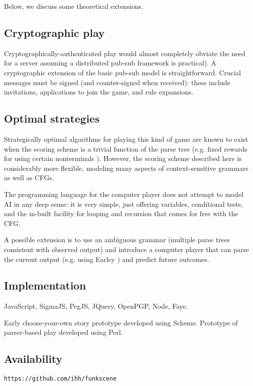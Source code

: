 \documentclass{acm_proc_article-sp}
\begin{document}
Below, we discuss some theoretical extensions.

\subsection{Cryptographic play}

Cryptographically-authenticated play would almost completely obviate the need for a server
assuming a distributed pub-sub framework is practical).
A cryptographic extension of the basic pub-sub model is straightforward.
Crucial messages must be signed (and counter-signed when received):
these include invitations, applications to join the game, and rule expansions.

\subsection{Optimal strategies}

Strategically optimal algorithms for playing this kind of game are known to exist when the scoring scheme is a trivial function of the parse tree (e.g. fixed rewards for using certain nonterminals \cite{DBLP:conf/icalp/EtessamiWY08}).
However, the scoring scheme described here is considerably more flexible, modeling many aspects of context-sensitive grammars as well as CFGs.

The programming language for the computer player does not attempt to model AI in any deep sense:
it is very simple, just offering variables, conditional tests, and the in-built facility for looping and recursion that comes for free with the CFG.

A possible extension is to use an ambiguous grammar (multiple parse trees consistent with observed output)
and introduce a computer player that can parse the current output (e.g. using Earley \cite{Stolcke}) and predict future outcomes.

\subsection{Implementation}

JavaScript, SigmaJS, PegJS, JQuery, OpenPGP, Node, Faye.

Early choose-your-own story prototype developed using Scheme.
Prototype of parser-based play developed using Perl.


\subsection{Availability}

{\tt https://github.com/ihh/funkscene}



\balancecolumns
\end{document}
